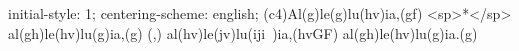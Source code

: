 initial-style: 1;
centering-scheme: english;
(c4)Al(g)le(g)lu(hv)ia,(gf) <sp>*</sp> al(gh)le(hv)lu(g)ia,(g) (,) al(hv)le(jv)lu(iji~)ia,(hvGF) al(gh)le(hv)lu(g)ia.(g)
